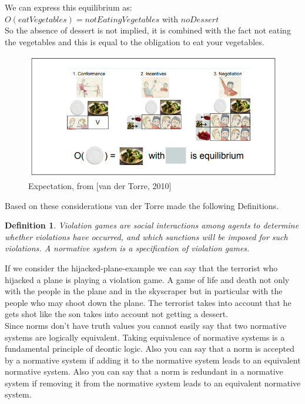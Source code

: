 \documentclass[conference]{hehe}
\newtheorem{definition}{Definition}
\begin{document}
We can express this equilibrium as:\\
$O(eatVegetables) = notEatingVegetables$ with $noDessert$\\
So the absence of dessert is not implied, it is combined with the fact not eating the vegetables and this is equal to the obligation to eat your vegetables.\\
\begin{center}
\begin{figure}[!htb]
    \centering
    \includegraphics[scale=0.8]{3.png}
    \caption{Expectation, from [van der Torre, 2010]}
    \label{fig:my_label}
\end{figure}
\end{center}

Based on these considerations van der Torre made the following Definitions.\\
\begin{definition}
Violation games are social interactions
among agents to determine whether violations have occurred, and which sanctions
will be imposed for such violations. A normative system is a specification of violation
games.\cite{b2}\\
\end{definition}

If we consider the hijacked-plane-example we can say that the terrorist who hijacked a plane is playing a violation game. A game of life and death not only with the people in the plane and in the skyscraper but in particular with the people who may shoot down the plane. The terrorist takes into account that he gets shot like the son takes into account not getting a dessert.\\
Since norms don't have truth values you cannot easily say that two normative systems are logically equivalent. Taking equivalence of normative systems is a fundamental principle of deontic logic. Also you can say that a norm is accepted by a normative system  if adding it to the normative system leads to an equivalent normative system. Also you can say that a norm is redundant in a normative system if removing it from the normative system leads to an equivalent normative system.\\
\end{document}
